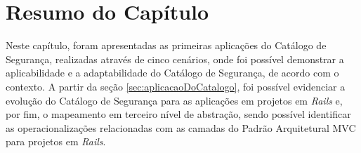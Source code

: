 \section{Resumo do Capítulo}

Neste capítulo, foram apresentadas as primeiras aplicações do Catálogo de Segurança, realizadas através de cinco cenários, onde foi possível demonstrar a aplicabilidade e a adaptabilidade do Catálogo de Segurança, de acordo com o contexto. A partir da seção \ref{sec:aplicacaoDoCatalogo}, foi possível evidenciar a evolução do Catálogo de Segurança para as aplicações em projetos em \textit{Rails} e, por fim, o mapeamento em terceiro nível de abstração, sendo possível identificar as operacionalizações relacionadas com as camadas do Padrão Arquitetural MVC para projetos em \textit{Rails}.


